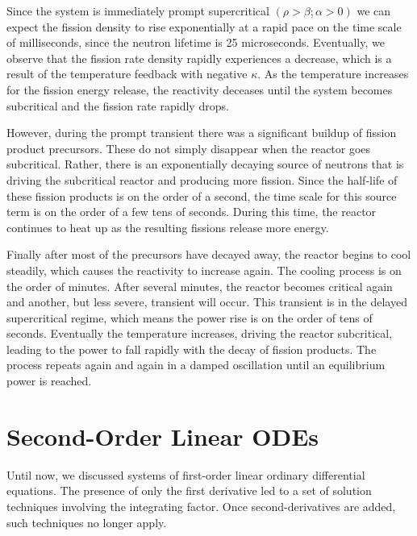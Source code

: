 Since the system is immediately prompt supercritical $(\rho > \beta; \alpha > 0)$ we can expect the fission density to rise exponentially at a rapid pace on the time scale of milliseconds, since the neutron lifetime is 25 microseconds. Eventually, we observe that the fission rate density rapidly experiences a decrease, which is a result of the temperature feedback with negative $\kappa$. As the temperature increases for the fission energy release, the reactivity deceases until the system becomes subcritical and the fission rate rapidly drops.

However, during the prompt transient there was a significant buildup of fission product precursors. These do not simply disappear when the reactor goes subcritical. Rather, there is an exponentially decaying source of neutrons that is driving the subcritical reactor and producing more fission. Since the half-life of these fission products is on the order of a second, the time scale for this source term is on the order of a few tens of seconds. During this time, the reactor continues to heat up as the resulting fissions release more energy.

Finally after most of the precursors have decayed away, the reactor begins to cool steadily, which causes the reactivity to increase again. The cooling process is on the order of minutes. After several minutes, the reactor becomes critical again and another, but less severe, transient will occur. This transient is in the delayed supercritical regime, which means the power rise is on the order of tens of seconds. Eventually the temperature increases, driving the reactor subcritical, leading to the power to fall rapidly with the decay of fission products. The process repeats again and again in a damped oscillation until an equilibrium power is reached.


\clearpage
\section{Second-Order Linear ODEs}

Until now, we discussed systems of first-order linear ordinary differential equations. The presence of only the first derivative led to a set of solution techniques involving the integrating factor. Once second-derivatives are added, such techniques no longer apply. 


